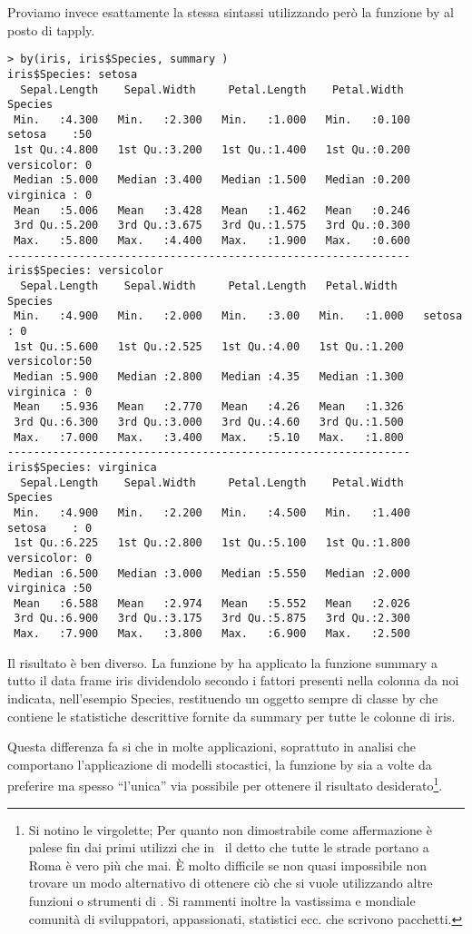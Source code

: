 Proviamo invece esattamente la stessa sintassi utilizzando però la funzione \textsf{by} al posto di \textsf{tapply}.
\begin{lstlisting}	
> by(iris, iris$Species, summary )
iris$Species: setosa
  Sepal.Length    Sepal.Width     Petal.Length    Petal.Width          Species  
 Min.   :4.300   Min.   :2.300   Min.   :1.000   Min.   :0.100   setosa    :50  
 1st Qu.:4.800   1st Qu.:3.200   1st Qu.:1.400   1st Qu.:0.200   versicolor: 0  
 Median :5.000   Median :3.400   Median :1.500   Median :0.200   virginica : 0  
 Mean   :5.006   Mean   :3.428   Mean   :1.462   Mean   :0.246                  
 3rd Qu.:5.200   3rd Qu.:3.675   3rd Qu.:1.575   3rd Qu.:0.300                  
 Max.   :5.800   Max.   :4.400   Max.   :1.900   Max.   :0.600                  
-------------------------------------------------------------- 
iris$Species: versicolor
  Sepal.Length    Sepal.Width     Petal.Length   Petal.Width          Species  
 Min.   :4.900   Min.   :2.000   Min.   :3.00   Min.   :1.000   setosa    : 0  
 1st Qu.:5.600   1st Qu.:2.525   1st Qu.:4.00   1st Qu.:1.200   versicolor:50  
 Median :5.900   Median :2.800   Median :4.35   Median :1.300   virginica : 0  
 Mean   :5.936   Mean   :2.770   Mean   :4.26   Mean   :1.326                  
 3rd Qu.:6.300   3rd Qu.:3.000   3rd Qu.:4.60   3rd Qu.:1.500                  
 Max.   :7.000   Max.   :3.400   Max.   :5.10   Max.   :1.800                  
-------------------------------------------------------------- 
iris$Species: virginica
  Sepal.Length    Sepal.Width     Petal.Length    Petal.Width          Species  
 Min.   :4.900   Min.   :2.200   Min.   :4.500   Min.   :1.400   setosa    : 0  
 1st Qu.:6.225   1st Qu.:2.800   1st Qu.:5.100   1st Qu.:1.800   versicolor: 0  
 Median :6.500   Median :3.000   Median :5.550   Median :2.000   virginica :50  
 Mean   :6.588   Mean   :2.974   Mean   :5.552   Mean   :2.026                  
 3rd Qu.:6.900   3rd Qu.:3.175   3rd Qu.:5.875   3rd Qu.:2.300                  
 Max.   :7.900   Max.   :3.800   Max.   :6.900   Max.   :2.500                  
\end{lstlisting}

Il risultato è ben diverso. La funzione \textsf{by} ha applicato la funzione \textsf{summary} a tutto il data frame iris dividendolo secondo i fattori presenti nella colonna da noi indicata, nell'esempio Species, restituendo un oggetto sempre di classe by che contiene le statistiche descrittive fornite da \textsf{summary} per tutte le colonne di iris. 

Questa differenza fa si che in molte applicazioni, soprattuto in analisi che comportano l'applicazione di modelli stocastici, la funzione \textsf{by} sia a volte da preferire ma spesso ``l'unica'' via possibile per ottenere il risultato desiderato\footnote{Si notino le virgolette; Per quanto non dimostrabile come affermazione è palese fin dai primi utilizzi che in \erre\ il detto che tutte le strade portano a Roma è vero più che mai. È molto difficile se non quasi impossibile non trovare un modo alternativo di ottenere ciò che si vuole utilizzando altre funzioni o strumenti di \erre. Si rammenti inoltre la vastissima e mondiale comunità di sviluppatori, appassionati, statistici ecc. che scrivono pacchetti.}. 

